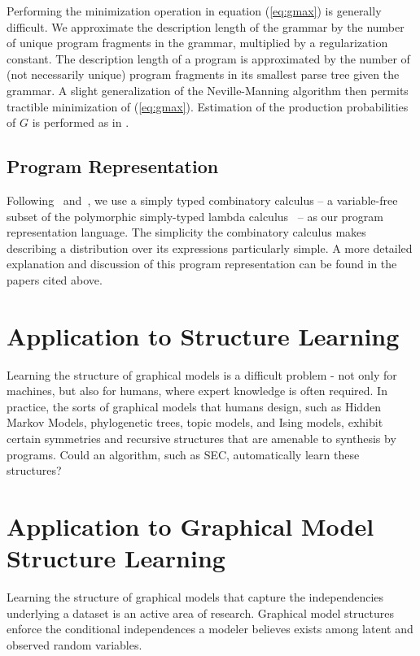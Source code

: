 \documentclass{article} %
\begin{document}
Performing the minimization operation in equation (\ref{eq:gmax}) is generally difficult.
We approximate the description length of the grammar by the number of unique program fragments in the grammar, multiplied by a regularization constant.
The description length of a program is approximated by the number of (not necessarily unique) program fragments in its smallest parse tree given the grammar.
A slight generalization of the Neville-Manning algorithm then permits tractible minimization of (\ref{eq:gmax}).
Estimation of the production probabilities of $G$ is performed as in \cite{ijcai}.

\subsection{Program Representation}

Following~\cite{DBLP:conf/ijcai/DechterMAT13} and~\cite{DBLP:conf/icml/LiangJK10}, we use a
simply typed combinatory calculus -- a variable-free subset of the
polymorphic simply-typed lambda calculus~\cite{DBLP:books/daglib/0005958} -- as our
program representation language. The simplicity the combinatory calculus makes describing a distribution over its expressions particularly simple. A more detailed explanation and discussion of this program representation can be found in the papers cited above. 

\section{Application to Structure Learning}
Learning the structure of graphical models is a difficult problem - not only for machines, but also for humans, where expert knowledge is often required.
In practice, the sorts of graphical models that humans design, such as Hidden Markov Models, phylogenetic trees, topic models, and Ising models, exhibit certain symmetries and recursive structures that are amenable to synthesis by programs.
Could an algorithm, such as SEC, automatically learn these structures?

\section{Application to Graphical Model Structure Learning}

Learning the structure of graphical models that capture the independencies underlying a dataset is an active area of research\cite{adams-wallach-ghahramani-2010a}\cite{ISI:000240797500002}\cite{ISI:000178037200004}\cite{ISI:A1995RX35400001}. Graphical model structures enforce the conditional independences a modeler believes exists among latent and observed random variables\cite{DBLP:books/daglib/0066829}. 
\end{document}
